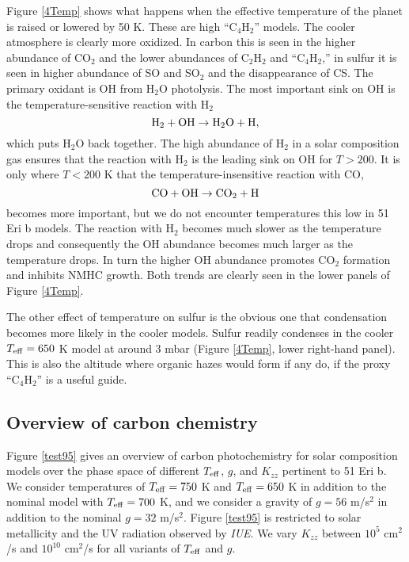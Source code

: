 \documentclass[preprint]{aastex6}
\newcounter{reaction}
\begin{document}
Figure \ref{4Temp} shows what happens when the effective temperature of the planet is raised or lowered by 50 K.
These are high ``C$_4$H$_2$'' models. %
The cooler atmosphere is clearly more oxidized.
In carbon this is seen in the higher abundance of CO$_2$ and the lower abundances of C$_2$H$_2$ and ``C$_4$H$_2$,''
in sulfur it is seen in higher abundance of SO and SO$_2$ and the disappearance of CS.
The primary oxidant is OH from H$_2$O photolysis.
The most important sink on OH is the temperature-sensitive reaction with H$_2$
\[
{\rm H}_2 + {\rm OH} \rightarrow {\rm H}_2{\rm O} + {\rm H},
\]
which puts H$_2$O back together.
The high abundance of H$_2$ in a solar composition gas ensures that the 
reaction with H$_2$ is the leading sink on OH for $T>200$.
It is only where $T< 200$ K that the temperature-insensitive reaction with CO,
\[
{\rm CO} + {\rm OH} \rightarrow {\rm CO}_2+ {\rm H} 
\]
becomes more important, but we do not encounter temperatures this low in 51 Eri b models.
The reaction with H$_2$ becomes much slower as the temperature drops and consequently the OH
abundance becomes much larger as the temperature drops.
In turn the higher OH abundance promotes CO$_2$ formation and inhibits NMHC growth.
Both trends are clearly seen in the lower panels of Figure \ref{4Temp}. 

The other effect of temperature on sulfur is the obvious one that condensation becomes more likely in the cooler models.
Sulfur readily condenses in the cooler $T_{\rm eff}=650$ K model at around 3 mbar (Figure \ref{4Temp}, lower right-hand panel). 
This is also the altitude where organic hazes would form if any do,
if the proxy ``C$_4$H$_2$'' is a useful guide. 

\subsection{Overview of carbon chemistry}

Figure \ref{test95} gives an overview of carbon photochemistry for solar composition
models over the phase space of different $T_{\rm eff}$, $g$, and $K_{zz}$ pertinent to 51 Eri b.  
We consider temperatures of $T_{\rm eff}=750$ K and $T_{\rm eff}=650$ K
in addition to the nominal model with $T_{\rm eff}=700$ K,
and we consider a gravity of $g=56$ m/s$^2$ in addition to the nominal $g=32$ m/s$^2$.
Figure \ref{test95} is restricted to solar metallicity and the {UV} radiation observed by {\it IUE}.
We vary $K_{zz}$ between $10^5$ cm$^2$/s and $10^{10}$ cm$^2$/s for all variants of $T_{\rm eff}$ and $g$. 
\end{document}
